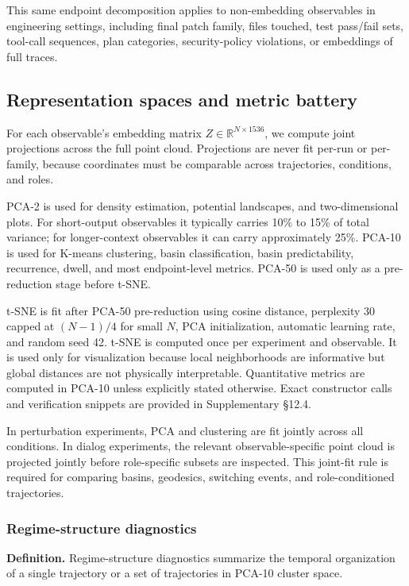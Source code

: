 \documentclass{article}
\theoremstyle{plain}
\theoremstyle{definition}
\begin{document}
This same endpoint decomposition applies to non-embedding observables in engineering settings, including final patch family, files touched, test pass/fail sets, tool-call sequences, plan categories, security-policy violations, or embeddings of full traces.

\subsection{Representation spaces and metric battery}

For each observable's embedding matrix \(Z\in\mathbb{R}^{N\times1536}\), we compute joint projections across the full point cloud. Projections are never fit per-run or per-family, because coordinates must be comparable across trajectories, conditions, and roles.

PCA-2 is used for density estimation, potential landscapes, and two-dimensional plots. For short-output observables it typically carries 10\% to 15\% of total variance; for longer-context observables it can carry approximately 25\%. PCA-10 is used for K-means clustering, basin classification, basin predictability, recurrence, dwell, and most endpoint-level metrics. PCA-50 is used only as a pre-reduction stage before t-SNE.

t-SNE is fit after PCA-50 pre-reduction using cosine distance, perplexity 30 capped at \((N-1)/4\) for small \(N\), PCA initialization, automatic learning rate, and random seed 42. t-SNE is computed once per experiment and observable. It is used only for visualization because local neighborhoods are informative but global distances are not physically interpretable. Quantitative metrics are computed in PCA-10 unless explicitly stated otherwise. Exact constructor calls and verification snippets are provided in Supplementary §12.4.

In perturbation experiments, PCA and clustering are fit jointly across all conditions. In dialog experiments, the relevant observable-specific point cloud is projected jointly before role-specific subsets are inspected. This joint-fit rule is required for comparing basins, geodesics, switching events, and role-conditioned trajectories.

\subsubsection{Regime-structure diagnostics}

\textbf{Definition.} Regime-structure diagnostics summarize the temporal organization of a single trajectory or a set of trajectories in PCA-10 cluster space.
\end{document}
